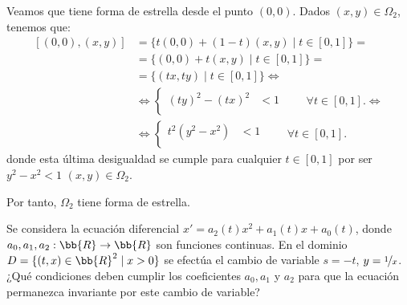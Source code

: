 \documentclass[12pt]{article}
\begin{document}
\begin{ejercicio}
\begin{enumerate}
            Veamos que tiene forma de estrella desde el punto $(0, 0)$. Dados $(x, y) \in \Omega_2$, tenemos que:
            \begin{align*}
                \left[(0,0), (x,y)\right] &= \{t(0, 0) +(1-t)(x,y) \mid t \in [0, 1]\}
                =\\&= \{(0, 0) + t(x, y) \mid t \in [0, 1]\}
                =\\&= \{(tx, ty) \mid t \in [0, 1]\}
                \Longleftrightarrow\\
                &\Longleftrightarrow \left\{
                \begin{aligned}
                    (ty)^2 - (tx)^2 &< 1\\
                \end{aligned}
                \right.\qquad \forall t \in [0, 1].
                \Longleftrightarrow\\
                &\Longleftrightarrow \left\{
                \begin{aligned}
                    t^2(y^2 - x^2) &< 1\\
                \end{aligned}
                \right.\qquad \forall t \in [0, 1].
            \end{align*}
            donde esta última desigualdad se cumple para cualquier $t \in [0, 1]$ por ser $y^2 - x^2 < 1$ $(x, y) \in \Omega_2$.

            Por tanto, $\Omega_2$ tiene forma de estrella.
        \end{enumerate}
    \end{ejercicio}

    \begin{ejercicio}
        Se considera la ecuación diferencial $x' = a_2(t)x^2 + a_1(t)x + a_0(t)$, donde $a_0, a_1, a_2 : \bb{R} \to \bb{R}$ son funciones continuas. En el dominio $D = \{(t, x) \in \bb{R}^2 \mid x > 0\}$ se efectúa el cambio de variable $s = -t$, $y = \nicefrac{1}{x}$. ¿Qué condiciones deben cumplir los coeficientes $a_0, a_1$ y $a_2$ para que la ecuación permanezca invariante por este cambio de variable?
    \end{ejercicio}
\end{document}
